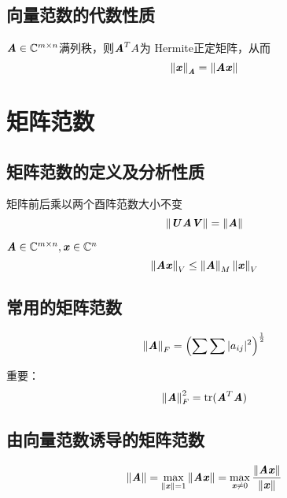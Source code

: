 \subsection{向量范数的代数性质}
\label{sub:向量范数的代数性质}

\begin{definition}
    $\MA \in \SetC^{m \times n}$满列秩，则$\MA^TA$为 \textrm{Hermite}正定矩阵，从而
    $$
    \norm{\Vx}_{\MA} = \norm{\MA \Vx}
    $$
\end{definition}

\section{矩阵范数}
\label{sec:矩阵范数}

\subsection{矩阵范数的定义及分析性质}
\label{sub:矩阵范数的定义及分析性质}

\begin{definition}[(广义)矩阵范数是酉不变的]
    矩阵前后乘以两个酉阵范数大小不变
    $$
    \norm{\MU \MA \MV} = \norm{\MA}
    $$
\end{definition}

\begin{definition}[矩阵范数与向量范数相容]
    $\MA \in \SetC^{m \times n}, \Vx \in \SetC^{n}$
    $$
    \norm{\MA \Vx}_{V} \leq \norm{\MA}_M \norm{\Vx}_V
    $$
\end{definition}


\subsection{常用的矩阵范数}
\label{sub:常用的矩阵范数}

\begin{definition}
    $$
    \norm{\MA}_F = \left ( \sum \sum |a_{ij}|^2 \right)^{\frac{1}{2}}
    $$
\end{definition}

重要：
$$
\norm{\MA}_F^2 = \mathrm{tr}(\MA^T\MA)
$$

\subsection{由向量范数诱导的矩阵范数}
\label{sub:由向量范数诱导的矩阵范数}

\begin{definition}[有向量范数诱导的矩阵范数或算子范数]
    $$
    \norm{\MA} = \max_{\norm{\Vx}=1} \norm{\MA \Vx} = \max_{\Vx \neq 0} \frac{\norm{\MA\Vx}}{\norm{\Vx}}
    $$
\end{definition}

